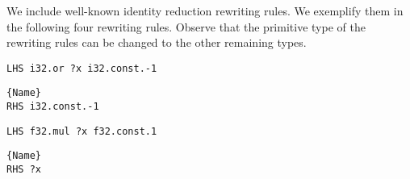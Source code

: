 We include well-known identity reduction rewriting rules. 
We exemplify them in the following four rewriting rules. 
Observe that the primitive type of the rewriting rules can be changed to the other remaining types. 


\begin{minipage}{0.95\linewidth}
\begin{minipage}{0.49\linewidth}
    
    \lstset{
    language=ttt,
    style=watcode,
    basicstyle=\footnotesize\ttfamily,
    columns=fullflexible,
    breaklines=true}
    \begin{lstlisting}[]
LHS i32.or ?x i32.const.-1
            \end{lstlisting}\vspace{-0.5cm}
    \noindent\hrulefill
        \lstset{
            language=ttt,
            style=watcode,
            basicstyle=\footnotesize\ttfamily,
            columns=fullflexible,
            breaklines=true}
            \vspace{-0.2cm}
            \begin{lstlisting}[numbers=none]{Name}
RHS i32.const.-1
    \end{lstlisting}
\end{minipage}
\begin{minipage}{0.49\linewidth}
    \lstset{
    language=ttt,
    style=watcode,
    basicstyle=\footnotesize\ttfamily,
    columns=fullflexible,
    breaklines=true}
    \begin{lstlisting}[]
LHS f32.mul ?x f32.const.1
            \end{lstlisting}\vspace{-0.5cm}
    \noindent\hrulefill
        \lstset{
            language=ttt,
            style=watcode,
            basicstyle=\footnotesize\ttfamily,
            columns=fullflexible,
            breaklines=true}
            \vspace{-0.2cm}
            \begin{lstlisting}[numbers=none]{Name}
RHS ?x
    \end{lstlisting}
\end{minipage}    
\end{minipage}


